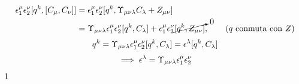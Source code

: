 \begin{prueba}
\begin{align}
  \epsilon_1^\mu \epsilon_2^\nu [q^k,[C_\mu,C_\nu ]]&=\epsilon_1^\mu \epsilon_2^\nu[q^k, \Upsilon_{\mu\nu\lambda}C_\lambda+Z_{\mu\nu }]\\
  &=\Upsilon_{\mu\nu\lambda}\epsilon_1^\mu \epsilon_2^\nu[q^k,C_\lambda]+\epsilon_1^\mu \epsilon_2^\nu\cancelto{0}{[q^k,Z_{\mu\nu }]},\qquad \text{($q$ conmuta con $Z$)}
\end{align}
\begin{equation}
  [\db_2,\db_1]q^k=\Upsilon_{\m\n\lambda}\epsilon_1^\m \epsilon_2^\n[q^k,C_\lambda]=\epsilon^\lambda[q^k,C_\lambda]
\end{equation}
\begin{equation}
  \implies \epsilon^\lambda=\Upsilon_{\mu\nu\lambda }\epsilon_1^\mu \epsilon_2^\nu
\end{equation}1
\end{prueba}



























































